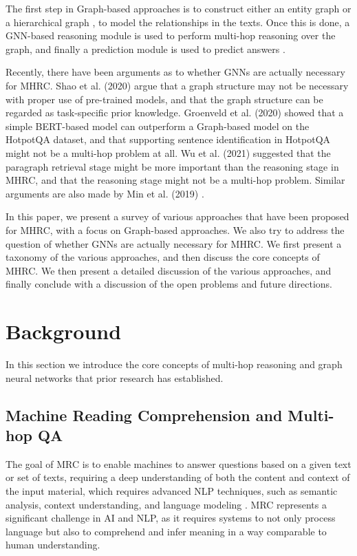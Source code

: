 \documentclass[sigplan,screen,nonacm]{acmart}
\begin{document}

The first step in Graph-based approaches is to construct either an entity graph \cite{RN81, RN117, RN122, RN141, RN91, RN130} or a hierarchical 
graph \cite{RN124, RN119, RN130}, to model the relationships in the texts. Once this is done, a 
GNN-based reasoning module is used to perform multi-hop reasoning over the graph, and finally a prediction module is used to predict answers 
\cite{RN23}.

Recently, there have been arguments as to whether GNNs are actually necessary for MHRC. Shao et al. (2020) \cite{RN127} argue that 
a graph structure may not be necessary with proper use of pre-trained models, and that the graph structure can be regarded as task-specific 
prior knowledge. Groenveld et al. (2020) \cite{RN126} showed that a simple BERT-based model can outperform a Graph-based model on the HotpotQA 
dataset, and that supporting sentence identification in HotpotQA might not be a multi-hop problem at all. Wu et al. (2021) \cite{RN106} 
suggested that the paragraph retrieval stage might be more important than the reasoning stage in MHRC, and that the reasoning stage might not 
be a multi-hop problem. Similar arguments are also made by Min et al. (2019) \cite{RN150}.

In this paper, we present a survey of various approaches that have been proposed for MHRC, with a focus on Graph-based approaches. We also 
try to address the question of whether GNNs are actually necessary for MHRC. We first present a taxonomy of the various approaches, and then 
discuss the core concepts of MHRC. We then present a detailed discussion of the various approaches, and finally conclude with a discussion of 
the open problems and future directions.

\section{Background}
In this section we introduce the core concepts of multi-hop reasoning and graph neural networks that prior research has established.  

\subsection{Machine Reading Comprehension and Multi-hop QA}
The goal of MRC is to enable machines to answer questions based on a given text or set of texts, requiring a deep understanding of both the 
content and context of the input material, which requires advanced NLP techniques, such as semantic analysis, context understanding, and 
language modeling \cite{RN208}. MRC represents a significant challenge in AI and NLP, as it requires systems to not only process language 
but also to comprehend and infer meaning in a way comparable to human understanding.
\end{document}
